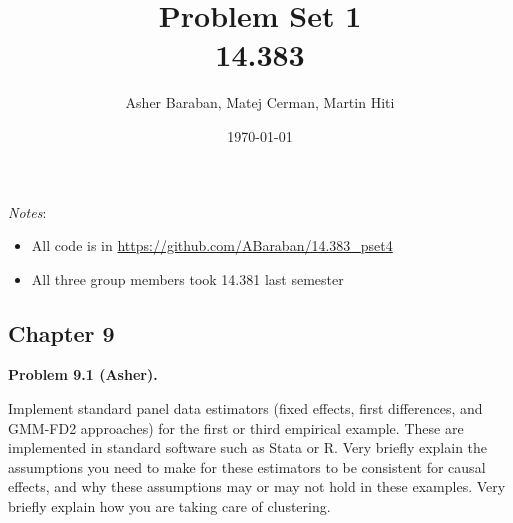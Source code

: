\documentclass[11pt]{article}
\title{Problem Set 1 \\ 14.383}
\author{Asher Baraban, Matej Cerman, Martin Hiti}
\date{\today}
\newenvironment{problem}[1]
    {\bigskip\noindent\textbf{Problem #1.}\par\setlength{\parindent}{0pt}}
    {\medskip}
\begin{document}
\maketitle

\noindent \textit{Notes}:
\begin{itemize}
    \item All code is in \url{https://github.com/ABaraban/14.383_pset4}
    \item All three group members took 14.381 last semester
\end{itemize}

\subsection*{Chapter 9} 
\begin{problem}{9.1 (Asher)}
Implement standard panel data estimators (fixed effects, first
differences, and GMM-FD2 approaches) for the first or third
empirical example. These are implemented in standard software
such as Stata or R. Very briefly explain the assumptions
you need to make for these estimators to be consistent for
causal effects, and why these assumptions may or may not
hold in these examples. Very briefly explain how you are
taking care of clustering.
\end{problem}
\end{document}
